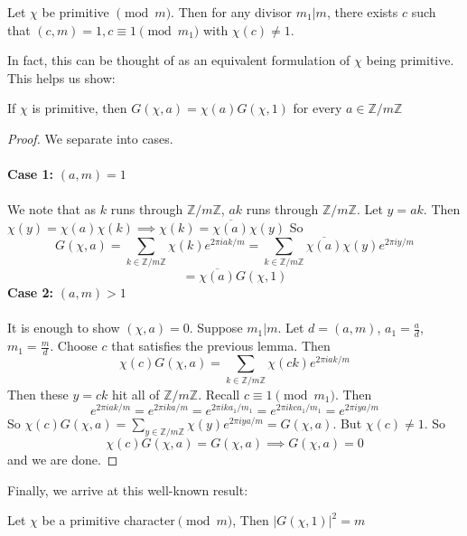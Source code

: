 \begin{lemma}
    Let $\chi$ be primitive $\pmod m$. Then for any divisor $m_1|m$, there exists 
    $c$ such that $(c,m)=1, c\equiv 1 \pmod {m_1}$ with $\chi(c)\neq 1$.
\end{lemma}
In fact, this can be thought of as an equivalent formulation of $\chi$ being
primitive. This helps us show:
\begin{lemma}
    If $\chi$ is primitive, then $G(\chi, a) = \chi(a)G(\chi, 1)$ for every $a \in \mathbb{Z}/m\mathbb{Z}$
\end{lemma}
\begin{proof}
    We separate into cases.\\\\
    \textbf{Case 1:} $(a,m)=1$\\\\
    We note that as $k$ runs through $\mathbb{Z}/{m\mathbb{Z}}$, $ak$ runs through
    $\mathbb{Z}/{m\mathbb{Z}}$. Let $y=ak$. Then $\chi(y)=\chi(a)\chi(k)\implies \chi(k)
    =\overline{\chi(a)}\chi(y)$
    So
    \[
        G(\chi,a)=\sum_{k\in\mathbb{Z}/m\mathbb{Z}}\chi(k)e^{2\pi iak/m} 
        =\sum_{k\in\mathbb{Z}/m\mathbb{Z}}\overline{\chi(a)}\chi(y)e^{2\pi iy/m} 
    \]
    \[
        =\overline{\chi(a)}G(\chi,1)  
    \]
    \textbf{Case 2:} $(a,m)>1$\\\\
    It is enough to show $(\chi, a)=0$. Suppose $m_1|m$. Let $d=(a,m)$, $a_1=\frac{a}{d}$, $m_1=\frac{m}{d}$. Choose 
    $c$ that satisfies the previous lemma. Then 
    \[
        \chi(c)G(\chi,a)=\sum_{k\in\mathbb{Z}/m\mathbb{Z}}\chi(ck)e^{2\pi iak/m}  
    \]
    Then these $y=ck$ hit all of $\mathbb{Z}/m\mathbb{Z}$. Recall $c\equiv 1\pmod {m_1}$. Then
    \[e^{2\pi iak/m}=e^{2\pi ika/m}=e^{2\pi ika_1/m_1}=e^{2\pi ikca_1/m_1}=e^{2\pi iya/m}\]
    So $\chi(c)G(\chi,a)=\sum_{y\in\mathbb{Z}/m\mathbb{Z}}\chi(y)e^{2\pi iya/m}=G(\chi,a)$.
    But $\chi(c)\neq 1$. So
    \[
        \chi(c)G(\chi,a)=G(\chi,a) \implies G(\chi,a)=0
    \]
    and we are done.
\end{proof}
Finally, we arrive at this well-known result:
\begin{theorem}
    Let $\chi$ be a primitive character$\pmod m$, Then $|G(\chi,1)|^2=m$
\end{theorem}
